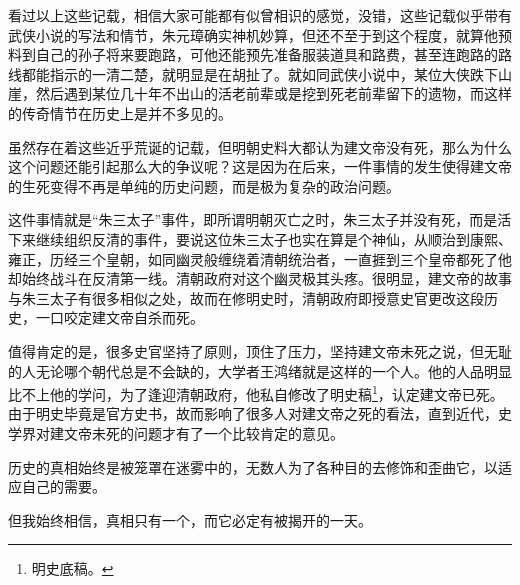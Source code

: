 \begin{multicols}{\theparacolNo}
看过以上这些记载，相信大家可能都有似曾相识的感觉，没错，这些记载似乎带有武侠小说的写法和情节，朱元璋确实神机妙算，但还不至于到这个程度，就算他预料到自己的孙子将来要跑路，可他还能预先准备服装道具和路费，甚至连跑路的路线都能指示的一清二楚，就明显是在胡扯了。就如同武侠小说中，某位大侠跌下山崖，然后遇到某位几十年不出山的活老前辈或是挖到死老前辈留下的遗物，而这样的传奇情节在历史上是并不多见的。

虽然存在着这些近乎荒诞的记载，但明朝史料大都认为建文帝没有死，那么为什么这个问题还能引起那么大的争议呢？这是因为在后来，一件事情的发生使得建文帝的生死变得不再是单纯的历史问题，而是极为复杂的政治问题。

这件事情就是“朱三太子”事件，即所谓明朝灭亡之时，朱三太子并没有死，而是活下来继续组织反清的事件，要说这位朱三太子也实在算是个神仙，从顺治到康熙、雍正，历经三个皇朝，如同幽灵般缠绕着清朝统治者，一直捱到三个皇帝都死了他却始终战斗在反清第一线。清朝政府对这个幽灵极其头疼。很明显，建文帝的故事与朱三太子有很多相似之处，故而在修明史时，清朝政府即授意史官更改这段历史，一口咬定建文帝自杀而死。

值得肯定的是，很多史官坚持了原则，顶住了压力，坚持建文帝未死之说，但无耻的人无论哪个朝代总是不会缺的，大学者王鸿绪就是这样的一个人。他的人品明显比不上他的学问，为了逢迎清朝政府，他私自修改了明史稿\footnote{明史底稿。}，认定建文帝已死。由于明史毕竟是官方史书，故而影响了很多人对建文帝之死的看法，直到近代，史学界对建文帝未死的问题才有了一个比较肯定的意见。

历史的真相始终是被笼罩在迷雾中的，无数人为了各种目的去修饰和歪曲它，以适应自己的需要。

但我始终相信，真相只有一个，而它必定有被揭开的一天。
\ifnum{}
	\end{multicols}
\fi
\newpage
